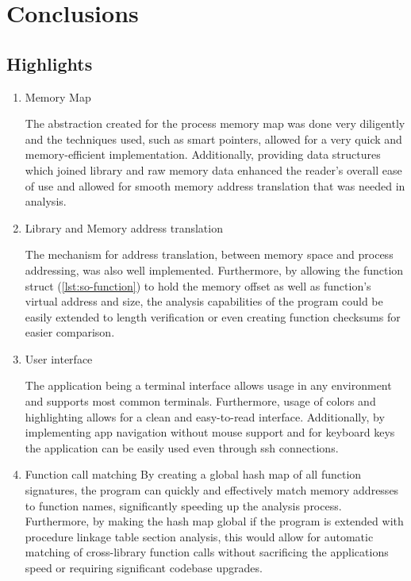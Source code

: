 \chapter{Conclusions}
\label{cha:conlusions}

\section{Highlights}

\begin{enumerate}
    \item{Memory Map} 
    
    The abstraction created for the process memory map was done very diligently and the techniques used, such as smart pointers, allowed for a very quick and memory-efficient implementation.
    Additionally, providing data structures which joined library and raw memory data enhanced the reader's overall ease of use and allowed for smooth memory address translation that was needed in analysis. 

    \item{Library and Memory address translation}

    The mechanism for address translation, between memory space and process addressing, was also well implemented.
    Furthermore, by allowing the function struct (\autoref{lst:so-function}) to hold the memory offset as well as function's virtual address and size, the analysis capabilities of the program could be easily extended to length verification or even creating function checksums for easier comparison.

    \item{User interface}

    The application being a terminal interface allows usage in any environment and supports most common terminals. 
    Furthermore, usage of colors and highlighting allows for a clean and easy-to-read interface.
    Additionally, by implementing app navigation without mouse support and for keyboard keys the application can be easily used even through ssh connections.

    \item {Function call matching}
    By creating a global hash map of all function signatures, the program can quickly and effectively match memory addresses to function names, significantly speeding up the analysis process.
    Furthermore, by making the hash map global if the program is extended with procedure linkage table section analysis, this would allow for automatic matching of cross-library function calls without sacrificing the applications speed or requiring significant codebase upgrades.


\end{enumerate}
